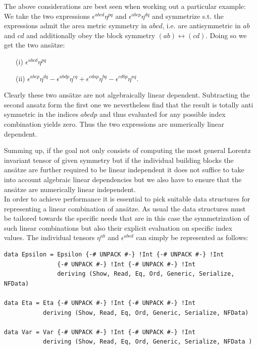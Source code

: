 \documentclass[a4paper,12pt, DIV=14, BCOR=5mm, twoside, headsepline]{scrbook}
\begin{document}
The above considerations are best seen when working out a particular example: We take the two expressions $\epsilon^{abcd} \eta^{pq}$ and $\epsilon^{abcp} \eta^{dq}$ and symmetrize s.t. the expressions admit the area metric symmetry in $abcd$, i.e. are antisymmetric in $ab$ and $cd$ and additionally obey the block symmetry $(ab) \leftrightarrow (cd)$. Doing so we get the two ansätze: 
\begin{itemize}
\item[(i)] $\epsilon^{abcd} \eta^{pq}$ 
\item[(ii)] $\epsilon^{abcp} \eta^{dq} - \epsilon^{abdp} \eta^{cq} + \epsilon^{cdap} \eta^{bq} - \epsilon^{cdbp} \eta^{aq}$.
\end{itemize}
Clearly these two ansätze are not algebraically linear dependent. Subtracting the second ansatz form the first one we nevertheless find that the result is totally anti symmetric in the indices $abcdp$ and thus evaluated for any possible index combination yields zero. Thus the two expressions are numerically linear dependent.

Summing up, if the goal not only consists of computing the most general Lorentz invariant tensor of given symmetry but if the individual building blocks the ansätze are further required to be linear independent it does not suffice to take into account algebraic linear dependencies but we also have to ensure that the ansätze are numerically linear independent.  \\

In order to achieve performance it is essential to pick suitable data structures for representing a linear combination of ansätze. As usual the data structures must be tailored towards the specific needs that are in this case the symmetrization of such linear combinations but also their explicit evaluation on specific index values.  
The individual tensors $\eta^{ab}$ and $\epsilon^{abcd}$ can simply be represented as follows:

\begin{samepage} 
\begin{verbatim}
data Epsilon = Epsilon {-# UNPACK #-} !Int {-# UNPACK #-} !Int
               {-# UNPACK #-} !Int {-# UNPACK #-} !Int
               deriving (Show, Read, Eq, Ord, Generic, Serialize, NFData)

data Eta = Eta {-# UNPACK #-} !Int {-# UNPACK #-} !Int 
           deriving (Show, Read, Eq, Ord, Generic, Serialize, NFData)

data Var = Var {-# UNPACK #-} !Int {-# UNPACK #-} !Int 
           deriving (Show, Read, Eq, Ord, Generic, Serialize, NFData )
\end{verbatim} 
\end{samepage}
\end{document}
